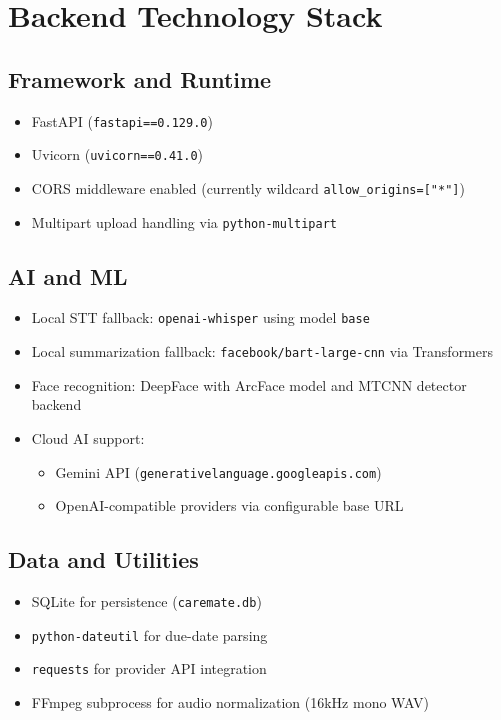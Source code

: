\documentclass[12pt,a4paper]{article}
\begin{document}
\section{Backend Technology Stack}

\subsection{Framework and Runtime}
\begin{itemize}
  \item FastAPI (\texttt{fastapi==0.129.0})
  \item Uvicorn (\texttt{uvicorn==0.41.0})
  \item CORS middleware enabled (currently wildcard \texttt{allow\_origins=["*"]})
  \item Multipart upload handling via \texttt{python-multipart}
\end{itemize}

\subsection{AI and ML}
\begin{itemize}
  \item Local STT fallback: \texttt{openai-whisper} using model \texttt{base}
  \item Local summarization fallback: \texttt{facebook/bart-large-cnn} via Transformers
  \item Face recognition: DeepFace with ArcFace model and MTCNN detector backend
  \item Cloud AI support:
  \begin{itemize}
    \item Gemini API (\texttt{generativelanguage.googleapis.com})
    \item OpenAI-compatible providers via configurable base URL
  \end{itemize}
\end{itemize}

\subsection{Data and Utilities}
\begin{itemize}
  \item SQLite for persistence (\texttt{caremate.db})
  \item \texttt{python-dateutil} for due-date parsing
  \item \texttt{requests} for provider API integration
  \item FFmpeg subprocess for audio normalization (16kHz mono WAV)
\end{itemize}
\end{document}
